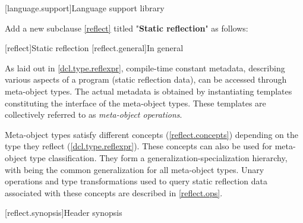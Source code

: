
[language.support]{Language support library}

\pnum
Add a new subclause \ref{reflect} titled "\textbf{Static reflection}" as follows:

\setcounter{section}{10}

[reflect]{Static reflection}
[reflect.general]{In general}

\begin{std.txt}\color{addclr}

\pnum
As laid out in \ref{dcl.type.reflexpr}, compile-time constant metadata,
describing various aspects of a program (static reflection data), can be
accessed through meta-object types.  The actual metadata is obtained by
instantiating templates constituting the interface of the meta-object types.
These templates are collectively referred to as \emph{meta-object operations}.

\pnum
Meta-object types satisfy different concepts (\ref{reflect.concepts}) depending on the type
they reflect (\ref{dcl.type.reflexpr}).  These concepts can also be used for
meta-object type classification.  They form a generalization-specialization
hierarchy, with  being the common generalization for all
meta-object types.  Unary operations and type transformations used to query
static reflection data associated with these concepts are described in
\ref{reflect.ops}.
  
\end{std.txt}

[reflect.synopsis]{Header  synopsis}

